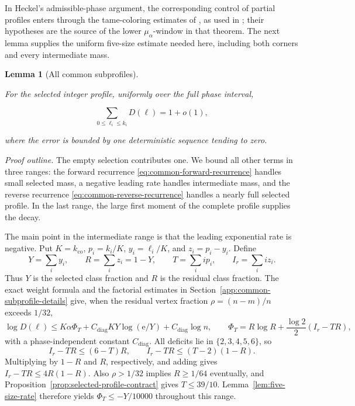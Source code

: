 \documentclass[a4paper,10pt,reqno]{amsart}
\numberwithin{equation}{section}
\theoremstyle{plain}
\newtheorem{lemma}[theorem]{Lemma}
\theoremstyle{remark}
\begin{document}
In Heckel's admissible-phase argument, the corresponding control of partial
profiles enters through the tame-coloring estimates of
\citet[Lemmas~5.1--5.3, 6.3--6.5, and~7.20]{heckel-panagiotou-2023},
as used in \citet[Proposition~5]{heckel-2025-difference}; their hypotheses are the
source of the lower \(\mu_\alpha\)-window in that theorem.  The next lemma
supplies the uniform five-size estimate needed here, including both corners
and every intermediate mass.

\begin{lemma}[All common subprofiles]
\label{lemma-7.1-all-common-subprofiles}

For the selected integer profile, uniformly over the full phase interval,

\[
 \sum_{0\le\ell_i\le k_i}D(\ell)=1+o(1),               \tag{7.7}
\]

where the error is bounded by one deterministic sequence tending to zero.

\end{lemma}

\emph{Proof outline.} The empty selection contributes one. We bound all
other terms in three ranges: the forward recurrence \eqref{eq:common-forward-recurrence} handles small
selected mass, a negative leading rate handles intermediate mass, and the
reverse recurrence \eqref{eq:common-reverse-recurrence} handles a nearly full selected profile. In the last
range, the large first moment of the complete profile supplies the decay.

The main point in the intermediate range is that the leading exponential
rate is negative. Put \(K=k_{\mathrm{co}}\), \(p_i=k_i/K\), \(y_i=\ell_i/K\),
and \(z_i=p_i-y_i\). Define
\[
 Y=\sum_i y_i,\qquad R=\sum_i z_i=1-Y,\qquad
 T=\sum_i i p_i,\qquad I_r=\sum_i i z_i.
\]
Thus \(Y\) is the selected class fraction and \(R\) is the residual class
fraction. The exact weight formula and the factorial estimates in
Section~\ref{app:common-subprofile-details} give, when the residual vertex
fraction \(\rho=(n-m)/n\) exceeds \(1/32\),
\[
 \log D(\ell)\le K\alpha\Phi_T
       +C_{\mathrm{diag}}KY\log(\mathrm e/Y)+C_{\mathrm{diag}}\log n,\qquad
 \Phi_T=R\log R+\frac{\log2}{2}(I_r-TR),
\]
with a phase-independent constant \(C_{\mathrm{diag}}\).
All deficits lie in $\{2,3,4,5,6\}$, so
\[
 I_r-TR\le(6-T)R,\qquad I_r-TR\le(T-2)(1-R).
\]
Multiplying by $1-R$ and $R$, respectively, and adding gives
$I_r-TR\le4R(1-R)$. Also $\rho>1/32$ implies $R\ge1/64$ eventually,
and Proposition~\ref{prop:selected-profile-contract} gives $T\le39/10$.
Lemma~\ref{lem:five-size-rate} therefore yields
$\Phi_T\le-Y/10000$ throughout this range.
\end{document}
